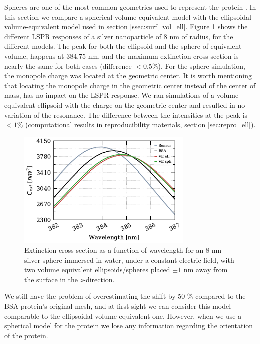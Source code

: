 Spheres are one of the most common geometries used to represent the protein \cite{SantiagoCordobaETal2011, UngerETal2009}. In this 
section we compare a spherical volume-equivalent model with the ellipsoidal volume-equivalent model used in section
\ref{ssec:surf_vol_ell}. Figure \ref{fig:sph_vs_ell_ve} shows the different LSPR responses of a silver nanoparticle of $8$ nm of radius, 
for the different models. The peak for both the ellipsoid and the sphere of equivalent volume, happens at $384.75$ nm, and the 
maximum extinction cross section is nearly the same for both cases (difference $<$0.5$\%$). For the sphere simulation, 
the monopole charge was located at the geometric center. It is worth mentioning that locating the monopole charge in the
geometric center instead of the center of mass, has no impact on the LSPR response. We ran simulations of a volume-equivalent ellipsoid 
with the charge on the geometric center and resulted in no variation of the resonance. The difference between the intensities at 
the peak is $<1\%$ (computational results in reproducibility materials, section \ref{sec:repro_ell}).

\begin{figure} %
    \centering
    \includegraphics[width=0.75\textwidth]{two_ve_ell_sph_vs_BSA.pdf} 
    \caption{Extinction cross-section as a function of wavelength for an $8$ nm
    silver sphere immersed in water, under a constant electric field, with two volume equivalent 
    ellipsoids/spheres placed $\pm 1$ nm away from the surface in the $z$-direction.}
    \label{fig:sph_vs_ell_ve}
 \end{figure}

We still have the problem of overestimating the shift by $50$ $\%$ compared to the BSA protein's original mesh, 
and at first sight we can consider this model comparable to the ellipsoidal volume-equivalent one. However, 
when we use a spherical model for the protein we lose any information regarding the orientation of the protein. 

